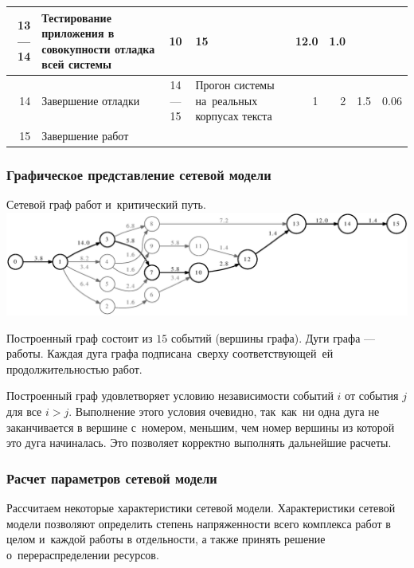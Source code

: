 {\begin{spacing}{1.2}
\begin{center}
\begin{longtable}{|r|m{3.8cm}|c|m{4cm}|r|r|r|r|}
			13 --- 14  &
			Тестирование приложения в совокупности отладка всей системы &
			10 & 15 & 12.0 & 1.0 \\	
		\hline
			14 &
			Завершение отладки &
			14 --- 15  &
			Прогон системы на~реальных корпусах текста &
			1 & 2 & 1.5 & 0.06 \\	
		\hline
			15 &
			\multicolumn{7}{l|}{			Завершение работ} \\	
		\hline
	\end{longtable} 
	\vspace{1cm}
\end{center}
\end{spacing}
}

\subsubsection{Графическое представление сетевой модели}

\begin{dfigure}{Сетевой граф работ и~критический путь.}
	\includegraphics[width=15cm]{./vec/net-model.eps}
\end{dfigure}

Построенный граф состоит из $15$ событий (вершины графа).
Дуги графа --- работы. Каждая дуга графа подписана~сверху соответствующей~ей
продолжительностью работ.

Построенный граф удовлетворяет условию независимости событий $i$ от
события $j$ для все $i > j$. Выполнение этого условия очевидно, так~как~ни одна
дуга не заканчивается в вершине с~номером, меньшим, чем номер вершины
из которой это дуга начиналась. Это позволяет корректно выполнять
дальнейшие расчеты.

\subsubsection{Расчет параметров сетевой модели}

Рассчитаем некоторые характеристики сетевой модели. Характеристики
сетевой модели позволяют определить степень напряженности всего
комплекса работ в целом и~каждой работы в отдельности, а также принять
решение о~перераспределении ресурсов.


